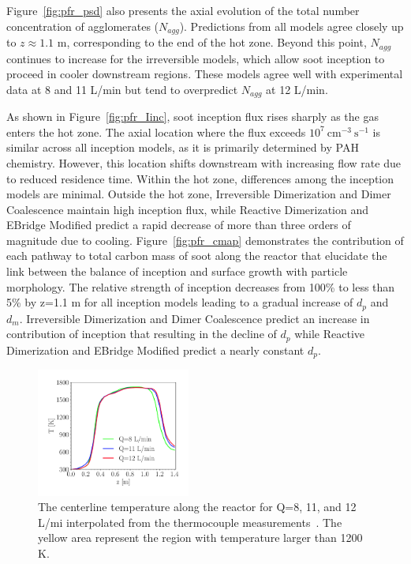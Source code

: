 Figure~\ref{fig:pfr_psd} also presents the axial evolution of the total number concentration of agglomerates ($N_{agg}$). Predictions from all models agree closely up to $z \approx 1.1$ m, corresponding to the end of the hot zone. Beyond this point, $N_{agg}$ continues to increase for the irreversible models, which allow soot inception to proceed in cooler downstream regions. These models agree well with experimental data at 8 and 11 L/min but tend to overpredict $N_{agg}$ at 12 L/min.

As shown in Figure~\ref{fig:pfr_Iinc}, soot inception flux rises sharply as the gas enters the hot zone. The axial location where the flux exceeds $10^7~\mathrm{cm^{-3}~s^{-1}}$ is similar across all inception models, as it is primarily determined by PAH chemistry. However, this location shifts downstream with increasing flow rate due to reduced residence time. Within the hot zone, differences among the inception models are minimal. Outside the hot zone, Irreversible Dimerization and Dimer Coalescence maintain high inception flux, while Reactive Dimerization and EBridge Modified predict a rapid decrease of more than three orders of magnitude due to cooling. Figure~\ref{fig:pfr_cmap} demonstrates the contribution of each pathway to total carbon mass of soot along the reactor that elucidate the link between the balance of inception and surface growth with particle morphology. The relative strength of inception decreases from 100\% to less than 5\% by z=1.1 m for all inception models leading to a gradual increase of $d_p$ and $d_m$. Irreversible Dimerization and Dimer Coalescence predict an increase in contribution of inception that resulting in the decline of $d_p$ while Reactive Dimerization and EBridge Modified predict a nearly constant $d_p$.


\begin{figure}[H]
	\centering
	\includegraphics[width=0.45\textwidth]{Figures/Results/PFR/temperature_combined.pdf}
	\caption{The centerline temperature along the reactor for Q=8, 11, and 12 L/mi interpolated from the thermocouple measurements~\citep{mei2019quantitative}. The yellow area represent the region with temperature larger than 1200 K.}
	\label{fig:pfr_temp} 
\end{figure}

